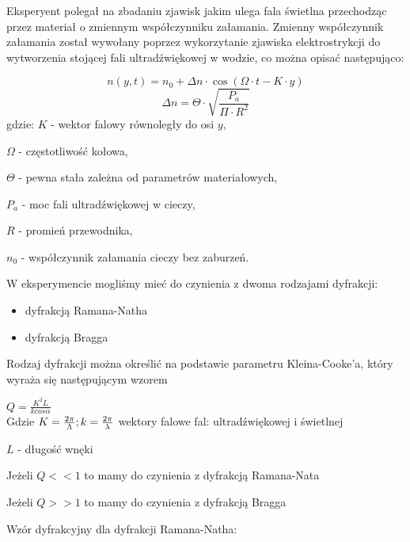 \documentclass[a4paper,12pt]{article}
\begin{document}


Eksperyent polegał na zbadaniu zjawisk jakim ulega fala świetlna przechodząc przez materiał o zmiennym współczynniku załamania. Zmienny współczynnik załamania został wywołany poprzez wykorzytanie zjawiska elektrostrykcji do wytworzenia stojącej fali ultradźwiękowej w wodzie, co można opisać następująco: 

$$ n(y,t) = n_0+\Delta n \cdot \cos (\Omega\cdot  t-K\cdot y) $$ 
$$ \Delta n = \Theta \cdot \sqrt{\frac{P_a}{\Pi \cdot R^2}}   $$
gdzie: \newline
$K$ - wektor falowy równoległy do osi $y$, 

$\Omega$ - częstotliwość kołowa,  

$\Theta$ - pewna stała zależna od parametrów materiałowych,
 
$P_a$ - moc fali ultradźwiękowej w cieczy,

$R$ - promień przewodnika,

$n_0$ - współczynnik załamania cieczy bez zaburzeń.



W eksperymencie mogliśmy mieć do czynienia z dwoma rodzajami dyfrakcji:
\begin{itemize}
\item dyfrakcją Ramana-Natha
\item dyfrakcją Bragga
\end{itemize}

Rodzaj dyfrakcji można określić na podstawie parametru Kleina-Cooke'a, który wyraża się następującym wzorem

\(
Q = \frac{K^2  L}{k cos \alpha }
\)
\\
Gdzie
\(
K = \frac{2 \pi}{ \Lambda }; \\ k = \frac{2 \pi}{\lambda}
\) wektory falowe fal: ultradźwiękowej i świetlnej

\( L  \) - długość wnęki

Jeżeli \( Q << 1\) to mamy do czynienia z dyfrakcją Ramana-Nata

Jeżeli \( Q >> 1 \) to mamy do czynienia z dyfrakcją Bragga

%
Wzór dyfrakcyjny dla dyfrakcji Ramana-Natha:
\end{document}
